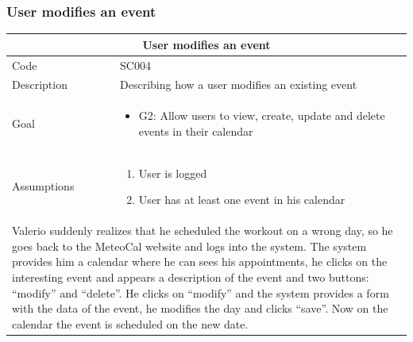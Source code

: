 \documentclass[10pt,a4paper,titlepage]{article}
\begin{document}
\subsubsection{User modifies an event}
\begin{tabular}{| p{3cm} | p{10cm} |}
\hline \multicolumn{2}{|c|}{\textbf{User modifies an event}} \\ 
\hline Code & SC004 \\ 
\hline Description & Describing how a user modifies an existing event \\
\hline Goal & \begin{itemize}\item G2: Allow users to view, create, update and delete events in their calendar\end{itemize}\\
\hline Assumptions & \begin{enumerate}
\item User is logged
\item User has at least one event in his calendar
\end{enumerate} \\
\hline \multicolumn{2}{|p{13cm}|}{Valerio suddenly realizes that he scheduled the workout on a wrong day, so he goes back to the MeteoCal website and logs into the system. The system provides him a calendar where he can sees his appointments, he clicks on the interesting event and appears a description of the event and two buttons: “modify” and “delete”. He clicks on “modify” and the system provides a form with the data of the event, he modifies the day and clicks “save”. Now on the calendar the event is scheduled on the new date.}\\
\hline
\end{tabular}
\end{document}
